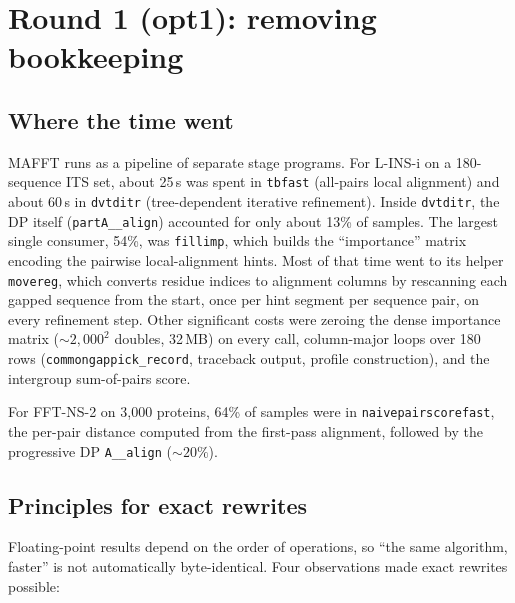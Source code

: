 \documentclass[11pt]{article}
\newcommand{\code}[1]{\texttt{#1}}
\begin{document}
\section{Round 1 (opt1): removing bookkeeping}
\label{sec:round1}

\subsection{Where the time went}

MAFFT runs as a pipeline of separate stage programs. For L-INS-i on a 180-sequence ITS set,
about 25\,s was spent in \code{tbfast} (all-pairs local alignment) and about 60\,s in
\code{dvtditr} (tree-dependent iterative refinement). Inside \code{dvtditr}, the DP itself
(\code{partA\_\_align}) accounted for only about 13\% of samples. The largest single
consumer, 54\%, was \code{fillimp}, which builds the ``importance'' matrix encoding the
pairwise local-alignment hints. Most of that time went to its helper \code{movereg}, which
converts residue indices to alignment columns by rescanning each gapped sequence from the
start, once per hint segment per sequence pair, on every refinement step. Other significant
costs were zeroing the dense importance matrix (${\sim}2{,}000^2$ doubles, 32\,MB) on every
call, column-major loops over 180 rows (\code{commongappick\_record}, traceback output,
profile construction), and the intergroup sum-of-pairs score.

For FFT-NS-2 on 3{,}000 proteins, 64\% of samples were in \code{naivepairscorefast}, the
per-pair distance computed from the first-pass alignment, followed by the progressive DP
\code{A\_\_align} (${\sim}20\%$).

\subsection{Principles for exact rewrites}
\label{sec:principles}

Floating-point results depend on the order of operations, so ``the same algorithm, faster''
is not automatically byte-identical. Four observations made exact rewrites possible:
\end{document}
